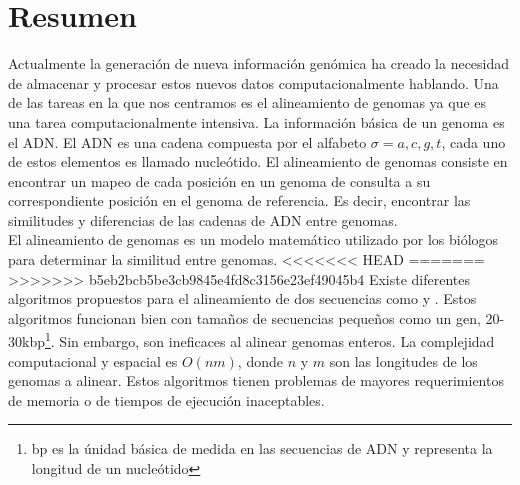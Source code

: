 \documentclass[12pt,a4paper]{article}
\begin{document}
\section{Resumen}
\indent
Actualmente la generación de nueva información genómica ha creado la necesidad de almacenar y procesar estos nuevos datos computacionalmente hablando. Una de las tareas en la que nos centramos es el alineamiento de genomas ya que es una tarea computacionalmente intensiva. La información básica de un genoma es el ADN. El ADN es una cadena compuesta por el alfabeto $\sigma={a,c,g,t}$, cada uno de estos elementos es llamado nucleótido. El alineamiento de genomas consiste en encontrar un mapeo de cada posición en un genoma de consulta a su correspondiente posición en el genoma de referencia. Es decir, encontrar las similitudes y diferencias de las cadenas de ADN entre genomas.\\
El alineamiento de genomas es un modelo matemático utilizado por los biólogos para determinar la similitud entre genomas. 
<<<<<<< HEAD
=======
\indent
>>>>>>> b5eb2bcb5be3cb9845e4fd8c3156e23ef49045b4
Existe diferentes algoritmos propuestos para el alineamiento de dos secuencias como \cite{Needleman1970General} y \cite{Waterman}. Estos algoritmos funcionan bien con tamaños de secuencias pequeños como un gen, 20-30kbp\footnote{bp es la únidad básica de medida en las secuencias de ADN y representa la longitud de un nucleótido}. Sin embargo, son ineficaces al alinear genomas enteros. La complejidad computacional y espacial es $O(nm)$, donde $n$ y $m$ son las longitudes de los genomas a alinear. Estos algoritmos tienen problemas de mayores requerimientos de memoria o de tiempos de ejecución inaceptables.\\
\end{document}
